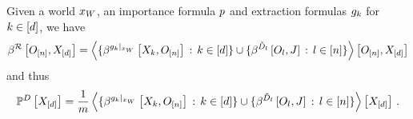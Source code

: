 \begin{theorem}
    \label{the:extractionrelationDecomposition}
    Given a \firstOrderLogic{} world $x_{W}$, an importance formula $p$ and extraction formulas $g_{k}$ for $k\in[d]$, we have
    \begin{align*}
        \beta^{\mathcal{R}}\left[O_{[n]},X_{[d]}\right] =
        \left\langle 
            \{\beta^{{g_{k}}|_{x_{W}}}\left[X_{k},O_{[n]}\right] \,:\, k\in[d]\}
            \cup \{\beta^{\tilde{D}_{l}}\left[O_{l},J\right] \,:\, l\in[n]\}
        \right\rangle \left[ O_{[n]},X_{[d]} \right]
    \end{align*}
    and thus
    \begin{align*}
        \mathbb{P}^{D}\left[X_{[d]}\right] =
        \frac{1}{m}  \left\langle 
            \{\beta^{{g_{k}}|_{x_{W}}}\left[X_{k},O_{[n]}\right] \,:\, k\in[d]\}
            \cup \{\beta^{\tilde{D}_{l}}\left[O_{l},J\right] \,:\, l\in[n]\}
        \right\rangle \left[ X_{[d]} \right] \, .
    \end{align*}
\end{theorem}
